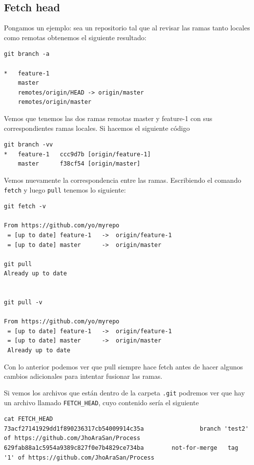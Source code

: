 \subsection{Fetch head}

Pongamos un ejemplo: sea un repositorio tal que al revisar las ramas tanto locales como remotas obtenemos el siguiente resultado:

\begin{verbatim}
git branch -a

*   feature-1
    master
    remotes/origin/HEAD -> origin/master
    remotes/origin/master
\end{verbatim}

Vemos que tenemos las dos ramas remotas master y feature-1 con sus correspondientes ramas locales. Si hacemos el siguiente código

\begin{verbatim}
git branch -vv
*   feature-1   ccc9d7b [origin/feature-1] 
    master      f38cf54 [origin/master]
\end{verbatim}

Vemos nuevamente la correspondencia entre las ramas. Escribiendo el comando \texttt{fetch} y luego \texttt{pull} tenemos lo siguiente:

\begin{verbatim}
git fetch -v

From https://github.com/yo/myrepo
 = [up to date] feature-1   ->  origin/feature-1
 = [up to date] master      ->  origin/master

git pull
Already up to date

 
git pull -v
 
From https://github.com/yo/myrepo
 = [up to date] feature-1   ->  origin/feature-1
 = [up to date] master      ->  origin/master 
 Already up to date
 \end{verbatim}

Con lo anterior podemos ver que pull siempre hace fetch antes de hacer algunos cambios adicionales para 
intentar fusionar las ramas.



Si vemos los archivos que están dentro de la carpeta \texttt{.git} podremos ver que hay un archivo llamado \texttt{FETCH\_HEAD}, cuyo contenido sería el siguiente


\begin{verbatim}
cat FETCH_HEAD
73acf27141929dd1f890236317cb54009914c35a                branch 'test2' of https://github.com/JhoAraSan/Process
629fab88a1c5954a9389c827f0e7b4829ce734ba        not-for-merge   tag '1' of https://github.com/JhoAraSan/Process
\end{verbatim}

